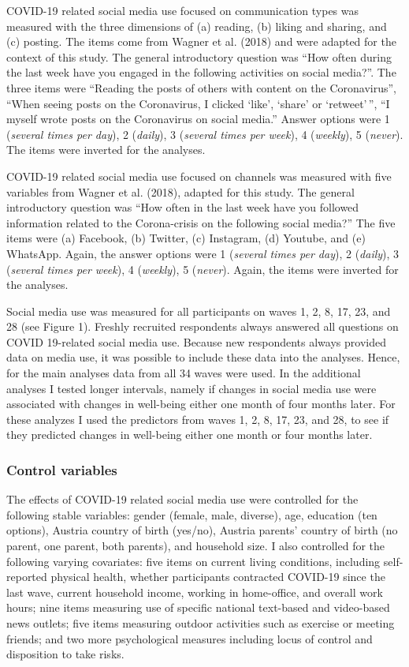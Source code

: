 \documentclass[
  man,mask,floatsintext]{apa7}
\begin{document}
COVID-19 related social media use focused on communication types was measured with the three dimensions of (a) reading, (b) liking and sharing, and (c) posting.
The items come from Wagner et al. (2018) and were adapted for the context of this study.
The general introductory question was ``How often during the last week have you engaged in the following activities on social media?''.
The three items were ``Reading the posts of others with content on the Coronavirus'', ``When seeing posts on the Coronavirus, I clicked `like', `share' or `retweet'\,'', ``I myself wrote posts on the Coronavirus on social media.''
Answer options were 1 (\emph{several times per day}), 2 (\emph{daily}), 3 (\emph{several times per week}), 4 (\emph{weekly}), 5 (\emph{never}).
The items were inverted for the analyses.

COVID-19 related social media use focused on channels was measured with five variables from Wagner et al. (2018), adapted for this study.
The general introductory question was ``How often in the last week have you followed information related to the Corona-crisis on the following social media?''
The five items were (a) Facebook, (b) Twitter, (c) Instagram, (d) Youtube, and (e) WhatsApp.
Again, the answer options were 1 (\emph{several times per day}), 2 (\emph{daily}), 3 (\emph{several times per week}), 4 (\emph{weekly}), 5 (\emph{never}).
Again, the items were inverted for the analyses.

Social media use was measured for all participants on waves 1, 2, 8, 17, 23, and 28 (see Figure 1).
Freshly recruited respondents always answered all questions on COVID 19-related social media use.
Because new respondents always provided data on media use, it was possible to include these data into the analyses.
Hence, for the main analyses data from all 34 waves were used.
In the additional analyses I tested longer intervals, namely if changes in social media use were associated with changes in well-being either one month of four months later.
For these analyzes I used the predictors from waves 1, 2, 8, 17, 23, and 28, to see if they predicted changes in well-being either one month or four months later.

\hypertarget{control-variables}{%
\subsubsection{Control variables}\label{control-variables}}

The effects of COVID-19 related social media use were controlled for the following stable variables:
gender (female, male, diverse), age, education (ten options), Austria country of birth (yes/no), Austria parents' country of birth (no parent, one parent, both parents), and household size.
I also controlled for the following varying covariates: five items on current living conditions, including self-reported physical health, whether participants contracted COVID-19 since the last wave, current household income, working in home-office, and overall work hours; nine items measuring use of specific national text-based and video-based news outlets; five items measuring outdoor activities such as exercise or meeting friends; and two more psychological measures including locus of control and disposition to take risks.
\end{document}
